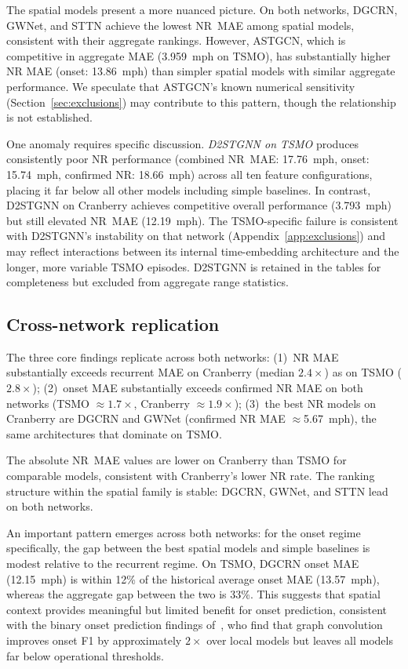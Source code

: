 \documentclass[a4paper]{cas-sc}
\begin{document}
The spatial models present a more nuanced picture.
On both networks, DGCRN, GWNet, and STTN achieve the lowest NR~MAE
among spatial models, consistent with their aggregate rankings.
However, ASTGCN, which is competitive in aggregate MAE (3.959~mph
on TSMO), has substantially higher NR MAE (onset: 13.86~mph) than
simpler spatial models with similar aggregate performance.
We speculate that ASTGCN's known numerical sensitivity
(Section~\ref{sec:exclusions}) may contribute to this pattern,
though the relationship is not established.

One anomaly requires specific discussion.
\emph{D2STGNN on TSMO} produces consistently poor NR performance
(combined NR~MAE: 17.76~mph, onset: 15.74~mph, confirmed NR: 18.66~mph)
across all ten feature configurations, placing it far below all
other models including simple baselines.
In contrast, D2STGNN on Cranberry achieves competitive overall
performance (3.793~mph) but still elevated NR~MAE (12.19~mph).
The TSMO-specific failure is consistent with D2STGNN's instability
on that network (Appendix~\ref{app:exclusions}) and may reflect
interactions between its internal time-embedding architecture and
the longer, more variable TSMO episodes.
D2STGNN is retained in the tables for completeness but excluded
from aggregate range statistics.

\subsection{Cross-network replication}
\label{sec:replication}

The three core findings replicate across both networks:
(1)~NR MAE substantially exceeds recurrent MAE on Cranberry
(median $2.4\times$) as on TSMO ($2.8\times$);
(2)~onset MAE substantially exceeds confirmed NR MAE on both
networks (TSMO $\approx 1.7\times$, Cranberry $\approx 1.9\times$);
(3)~the best NR models on Cranberry are DGCRN and GWNet
(confirmed NR MAE $\approx$5.67~mph), the same architectures that
dominate on TSMO.

The absolute NR~MAE values are lower on Cranberry than TSMO for
comparable models, consistent with Cranberry's lower NR rate.
The ranking structure within the spatial family is stable:
DGCRN, GWNet, and STTN lead on both networks.

An important pattern emerges across both networks:
for the onset regime specifically, the gap between the best spatial
models and simple baselines is modest relative to the recurrent regime.
On TSMO, DGCRN onset MAE (12.15~mph) is within 12\% of the
historical average onset MAE (13.57~mph), whereas the aggregate
gap between the two is 33\%.
This suggests that spatial context provides meaningful but limited
benefit for onset prediction, consistent with the binary onset
prediction findings of~\citet{bae2026onset}, who find that graph
convolution improves onset F1 by approximately $2\times$ over
local models but leaves all models far below operational thresholds.
\end{document}
